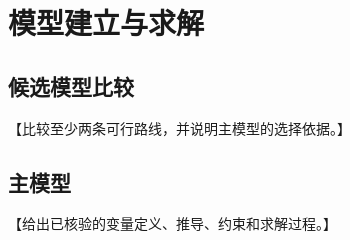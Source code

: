 \section{模型建立与求解}
\subsection{候选模型比较}
【比较至少两条可行路线，并说明主模型的选择依据。】
\subsection{主模型}
【给出已核验的变量定义、推导、约束和求解过程。】
